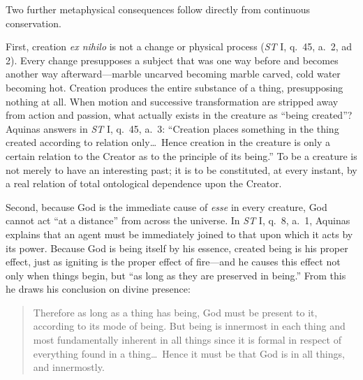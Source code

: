 Two further metaphysical consequences follow directly from continuous conservation.

First, creation \emph{ex nihilo} is not a change or physical process (\emph{ST} I, q.\ 45, a.\ 2, ad 2). Every change presupposes a subject that was one way before and becomes another way afterward---marble uncarved becoming marble carved, cold water becoming hot. Creation produces the entire substance of a thing, presupposing nothing at all. When motion and successive transformation are stripped away from action and passion, what actually exists in the creature as ``being created''? Aquinas answers in \emph{ST} I, q.\ 45, a.\ 3: ``Creation places something in the thing created according to relation only\dots\ Hence creation in the creature is only a certain relation to the Creator as to the principle of its being.'' To be a creature is not merely to have an interesting past; it is to be constituted, at every instant, by a real relation of total ontological dependence upon the Creator.

Second, because God is the immediate cause of \emph{esse} in every creature, God cannot act ``at a distance'' from across the universe. In \emph{ST} I, q.\ 8, a.\ 1, Aquinas explains that an agent must be immediately joined to that upon which it acts by its power. Because God is being itself by his essence, created being is his proper effect, just as igniting is the proper effect of fire---and he causes this effect not only when things begin, but ``as long as they are preserved in being.'' From this he draws his conclusion on divine presence:

\begin{quote}
Therefore as long as a thing has being, God must be present to it, according to its mode of being. But being is innermost in each thing and most fundamentally inherent in all things since it is formal in respect of everything found in a thing\dots\ Hence it must be that God is in all things, and innermostly.
\end{quote}

